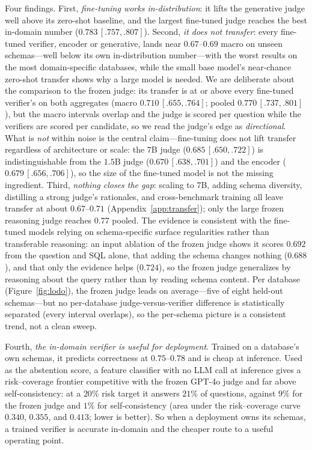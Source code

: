 \documentclass[11pt]{article}
\begin{document}
Four findings. First, \emph{fine-tuning works in-distribution}: it lifts the generative judge well
above its zero-shot baseline, and the largest fine-tuned judge reaches the best in-domain number
($0.783\,[.757,.807]$). Second, \emph{it does not transfer}: every fine-tuned verifier, encoder or
generative, lands near $0.67$--$0.69$ macro on unseen schemas---well below its own in-distribution
number---with the worst results on the most domain-specific databases, while the small base model's
near-chance zero-shot transfer shows why a large model is needed. We are deliberate about the
comparison to the frozen judge: its transfer is at or above every fine-tuned verifier's on both
aggregates (macro $0.710\,[.655,.764]$; pooled $0.770\,[.737,.801]$), but the macro intervals overlap
and the judge is scored per question while the verifiers are scored per candidate, so we read the
judge's edge as \emph{directional}. What is \emph{not} within noise is the central claim---fine-tuning
does not lift transfer regardless of architecture or scale: the $7$B judge ($0.685\,[.650,.722]$) is
indistinguishable from the $1.5$B judge ($0.670\,[.638,.701]$) and the encoder ($0.679\,[.656,.706]$),
so the size of the fine-tuned model is not the missing ingredient. Third, \emph{nothing closes the
gap}: scaling to 7B, adding schema diversity, distilling a strong judge's rationales, and
cross-benchmark training all leave transfer at about $0.67$--$0.71$ (Appendix~\ref{app:transfer}); only
the large frozen reasoning judge reaches $0.77$ pooled. The evidence is consistent with the fine-tuned
models relying on schema-specific surface regularities rather than transferable reasoning: an input
ablation of the frozen judge shows it scores $0.692$ from the question and SQL alone, that adding the
schema changes nothing ($0.688$), and that only the evidence helps ($0.724$), so the frozen judge
generalizes by reasoning about the query rather than by reading schema content. Per database
(Figure~\ref{fig:lodo}), the frozen judge leads on average---five of eight held-out schemas---but no
per-database judge-versus-verifier difference is statistically separated (every interval overlaps), so
the per-schema picture is a consistent trend, not a clean sweep.

Fourth, \emph{the in-domain verifier is useful for deployment}. Trained on a database's own schemas,
it predicts correctness at $0.75$--$0.78$ and is cheap at inference. Used as the abstention score, a
feature classifier with no LLM call at inference gives a risk--coverage frontier competitive with the
frozen GPT-4o judge and far above self-consistency: at a $20\%$ risk target it answers $21\%$ of
questions, against $9\%$ for the frozen judge and $1\%$ for self-consistency (area under the
risk--coverage curve $0.340$, $0.355$, and $0.413$; lower is better). So when a deployment owns its
schemas, a trained verifier is accurate in-domain and the cheaper route to a useful operating point.
\end{document}
